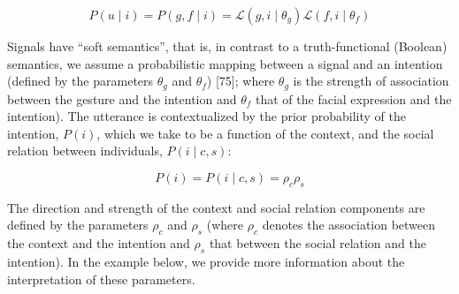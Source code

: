\documentclass[
  man,floatsintext]{apa6}
\begin{document}
\begin{equation}
P(u \mid i) = P(g,f \mid i) = \mathcal{L}(g,i \mid \theta_{g}) \mathcal{L}(f,i \mid \theta_{f})
\end{equation}

Signals have ``soft semantics'', that is, in contrast to a truth-functional (Boolean) semantics, we assume a probabilistic mapping between a signal and an intention (defined by the parameters \(\theta_{g}\) and \(\theta_{f}\)) {[}75{]}; where \(\theta_{g}\) is the strength of association between the gesture and the intention and \(\theta_{f}\) that of the facial expression and the intention). The utterance is contextualized by the prior probability of the intention, \(P(i)\), which we take to be a function of the context, and the social relation between individuals, \(P(i \mid c,s)\):

\begin{equation}
P(i)=P(i \mid c,s) = \rho_c \rho_s
\end{equation}

The direction and strength of the context and social relation components are defined by the parameters \(\rho_c\) and \(\rho_s\) (where \(\rho_c\) denotes the association between the context and the intention and \(\rho_s\) that between the social relation and the intention). In the example below, we provide more information about the interpretation of these parameters.
\end{document}
